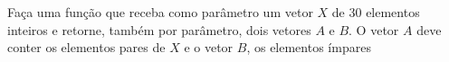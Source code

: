 
\question[10]

Faça uma função que receba como parâmetro um vetor $X$ de 30 elementos inteiros e retorne, também por parâmetro, dois vetores $A$ e $B$. O vetor $A$ deve conter os elementos pares de $X$ e o vetor $B$, os elementos  ímpares

